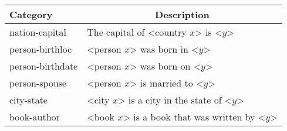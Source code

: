 \begin{table}[t!]
    \centering
    \begin{tabular}{l|l}
        \hline\hline
        \textbf{Category} & \multicolumn{1}{c}{\textbf{Description}} \\\hline
        \textsf{nation-capital}     &   The capital of <country $x$> is <$y$> \\
        \textsf{person-birthloc}    &   <person $x$> was born in <$y$> \\
        \textsf{person-birthdate}   &   <person $x$> was born on <$y$> \\
        \textsf{person-spouse}      &   <person $x$> is married to <$y$> \\
        \textsf{city-state}         &   <city $x$> is a city in the state of <$y$> \\
        \textsf{book-author}        &   <book $x$> is a book that was written by <$y$> \\
        \hline\hline
    \end{tabular}
\end{table}
